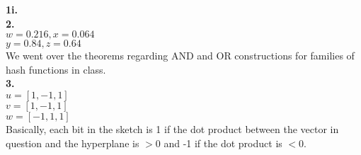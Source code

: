 \documentclass[10pt]{amsart}
\begin{document}
\textbf{1i.} \\


\textbf{2.} \\
  $w = 0.216, x = 0.064$ \\
  $y = 0.84, z = 0.64$ \\

  We went over the theorems regarding AND and OR constructions for families of
  hash functions in class. \\

\textbf{3.} \\

  $u = [1, -1, 1]$ \\ 
  $v = [1, -1, 1]$ \\ 
  $w = [-1, 1, 1]$ \\

  Basically, each bit in the sketch is 1 if the dot product between the
  vector in question and the hyperplane is $> 0$ and -1 if the dot product 
  is $< 0$.
\end{document}
